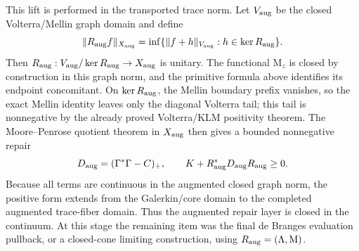 \documentclass[11pt]{article}
\newcommand{\Mu}{\mathrm{M}}
\begin{document}
This lift is performed in the transported trace norm.  Let \(V_{\rm aug}\) be
the closed Volterra/Mellin graph domain and define
\[
  \|R_{\rm aug}f\|_{X_{\rm aug}}
  =\inf\{\|f+h\|_{V_{\rm aug}}:h\in\ker R_{\rm aug}\}.
\]
Then \(R_{\rm aug}:V_{\rm aug}/\ker R_{\rm aug}\to X_{\rm aug}\) is unitary.
The functional \(\Mu_z\) is closed by construction in this graph norm, and
the primitive formula above identifies its endpoint concomitant.  On
\(\ker R_{\rm aug}\), the Mellin boundary prefix vanishes, so the exact
Mellin identity leaves only the diagonal Volterra tail; this tail is
nonnegative by the already proved Volterra/KLM positivity theorem.  The
Moore--Penrose quotient theorem in \(X_{\rm aug}\) then gives a bounded
nonnegative repair
\[
  D_{\rm aug}=(\Gamma^*\Gamma-C)_+,\qquad
  K+R_{\rm aug}^*D_{\rm aug}R_{\rm aug}\ge 0 .
\]
Because all terms are continuous in the augmented closed graph norm, the
positive form extends from the Galerkin/core domain to the completed
augmented trace-fiber domain.  Thus the augmented repair layer is closed in
the continuum.  At this stage the remaining item was the final de Branges
evaluation pullback, or a closed-cone limiting construction, using
\(R_{\rm aug}=(\Lambda,\Mu)\).
\end{document}
